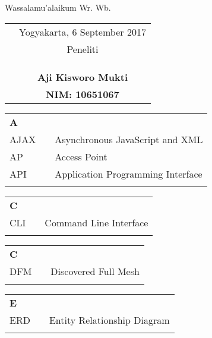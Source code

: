 \documentclass{tif-uin-suka}
\def \createddate{6 September 2017}
\def \writerlabelCap{Peneliti}
\def \city{Yogyakarta}
\begin{document}
Wassalamu'alaikum Wr. Wb.

\begin{tabular}{p{7.5cm}c}
&{\city}, {\createddate} \\
&{\writerlabelCap} \\
&\\
&\\
&\\
&\textbf{Aji Kisworo Mukti} \\
&\textbf{NIM: 10651067}
\end{tabular}

\acknowledgment

\tableofcontents
{}
\listoftables
{}
\listoffigures
{}

\singkatan
\noindent

\begin{tabular}{p{20pt}p{3pt}l}
\textbf{A}\\
AJAX & & Asynchronous JavaScript and XML\\
AP & & Access Point\\
API & & Application Programming Interface\\
\\
\end{tabular}

\begin{tabular}{p{20pt}p{3pt}l}
\textbf{C}\\
CLI & & Command Line Interface\\
\\
\end{tabular}

\begin{tabular}{p{20pt}p{3pt}l}
\textbf{C}\\
DFM & & Discovered Full Mesh\\
\\
\end{tabular}

\begin{tabular}{p{20pt}p{3pt}l}
\textbf{E}\\
ERD & & Entity Relationship Diagram\\
\\
\end{tabular}
\end{document}
